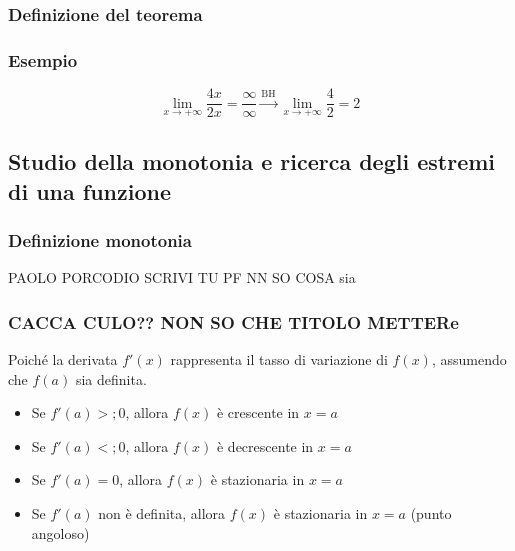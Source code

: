 \documentclass{article}
\begin{document}
\subsubsection{Definizione del teorema}


\subsubsection{Esempio}
\begin{equation*}
    \lim_{x \to +\infty} \frac{4x}{2x} = \frac{\infty}{\infty}
    \overset{\text{BH}}{\longrightarrow} \lim_{x \to +\infty} \frac{4}{2} = 2
\end{equation*}

\newpage
\subsection{Studio della monotonia e ricerca degli estremi di una funzione}
\subsubsection{Definizione monotonia}
PAOLO PORCODIO SCRIVI TU PF NN SO COSA sia

\subsubsection{CACCA CULO?? NON SO CHE TITOLO METTERe}
Poiché la derivata \(f'(x)\) rappresenta il tasso di variazione di \(f(x)\), assumendo che
\(f(a)\) sia definita.

\begin{itemize}
    \item Se \(f'(a) >; 0\), allora \(f(x)\) è crescente in \(x = a\)
    \item Se \(f'(a) <; 0\), allora \(f(x)\) è decrescente in \(x = a\)
    \item Se \(f'(a) = 0\), allora \(f(x)\) è stazionaria in \(x = a\)
    \item Se \(f'(a)\) non è definita, allora \(f(x)\) è stazionaria in \(x = a\)
    (punto angoloso)
\end{itemize}
\end{document}
